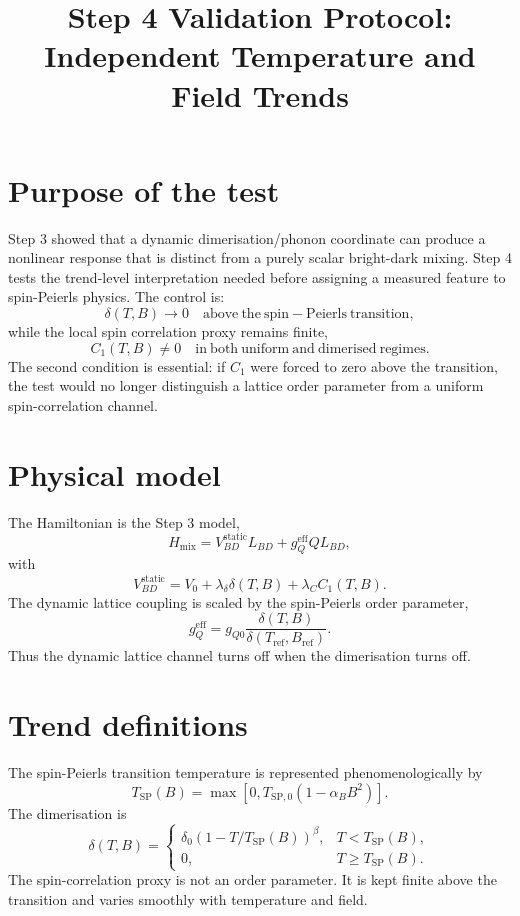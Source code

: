 \documentclass[11pt]{article}
\title{Step 4 Validation Protocol: Independent Temperature and Field Trends}
\author{}
\date{}
\begin{document}
\maketitle

\section{Purpose of the test}
Step 3 showed that a dynamic dimerisation/phonon coordinate can produce a
nonlinear response that is distinct from a purely scalar bright-dark mixing.
Step 4 tests the trend-level interpretation needed before assigning a measured
feature to spin-Peierls physics.  The control is:
\begin{equation}
\delta(T,B) \rightarrow 0
\quad\mathrm{above\ the\ spin\!-\!Peierls\ transition},
\end{equation}
while the local spin correlation proxy remains finite,
\begin{equation}
C_1(T,B) \ne 0
\quad\mathrm{in\ both\ uniform\ and\ dimerised\ regimes}.
\end{equation}
The second condition is essential: if $C_1$ were forced to zero above the
transition, the test would no longer distinguish a lattice order parameter from
a uniform spin-correlation channel.

\section{Physical model}
The Hamiltonian is the Step 3 model,
\begin{equation}
H_{\mathrm{mix}} =
V_{BD}^{\mathrm{static}} L_{BD}
+ g_Q^{\mathrm{eff}} Q L_{BD},
\end{equation}
with
\begin{equation}
V_{BD}^{\mathrm{static}} =
V_0 + \lambda_\delta \delta(T,B) + \lambda_C C_1(T,B).
\end{equation}
The dynamic lattice coupling is scaled by the spin-Peierls order parameter,
\begin{equation}
g_Q^{\mathrm{eff}} = g_{Q0}
\frac{\delta(T,B)}{\delta(T_{\mathrm{ref}},B_{\mathrm{ref}})}.
\end{equation}
Thus the dynamic lattice channel turns off when the dimerisation turns off.

\section{Trend definitions}
The spin-Peierls transition temperature is represented phenomenologically by
\begin{equation}
T_{\mathrm{SP}}(B) =
\max\left[0, T_{\mathrm{SP},0}(1-\alpha_B B^2)\right].
\end{equation}
The dimerisation is
\begin{equation}
\delta(T,B)=
\begin{cases}
\delta_0 \left(1-T/T_{\mathrm{SP}}(B)\right)^\beta,
& T<T_{\mathrm{SP}}(B),\\
0, & T\ge T_{\mathrm{SP}}(B).
\end{cases}
\end{equation}
The spin-correlation proxy is not an order parameter.  It is kept finite above
the transition and varies smoothly with temperature and field.
\end{document}

